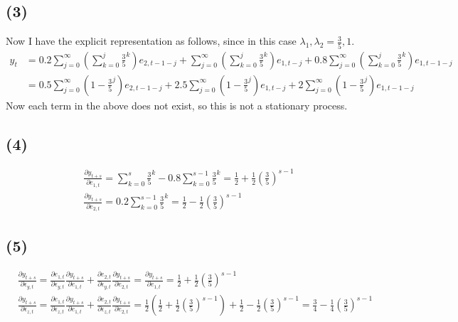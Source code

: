 \documentclass{article}
\begin{document}
\subsection{(3)}
 Now I have the explicit representation as follows, since in this case $\lambda_1, \lambda_2 = \frac{3}{5}, 1$.
\begin{align*}
	y_t &= 0.2 \sum_{j = 0}^{\infty} \left( \sum_{k = 0}^{j} \frac{3}{5}^{k} \right) e_{2, t-1-j}+\sum_{j = 0}^{\infty} \left( \sum_{k = 0}^{j} \frac{3}{5}^{k} \right) e_{1, t-j} + 0.8 \sum_{j = 0}^{\infty} \left( \sum_{k = 0}^{j} \frac{3}{5}^{k} \right) e_{1, t-1-j}\\[10pt]
	&= 0.5 \sum_{j = 0}^{\infty} \left( 1 - \frac{3}{5}^j\right) e_{2, t-1-j} + 2.5 \sum_{j = 0}^{\infty} \left( 1 - \frac{3}{5}^j\right) e_{1, t-j} + 2 \sum_{j = 0}^{\infty} \left( 1 - \frac{3}{5}^j\right) e_{1, t-1-j}
\end{align*}
Now each term in the above does not exist, so this is not a stationary process. 

\subsection{(4)}
\begin{align*}
 &\frac{\partial y_{t+s}}{\partial e_{1, t}} = \sum_{k = 0}^{s} \frac{3}{5}^k - 0.8 \sum_{k = 0}^{s-1} \frac{3}{5}^k = \frac{1}{2} + \frac{1}{2} \left( \frac{3}{5} \right)^{s-1}\\[8pt]
 &\frac{\partial y_{t+s}}{\partial e_{2, t}} = 0.2 \sum_{k = 0}^{s-1} \frac{3}{5}^k = \frac{1}{2} -\frac{1}{2} \left( \frac{3}{5}\right)^{s-1}
\end{align*}

\subsection{(5)}
\begin{align*}
	&\frac{\partial y_{t+s}}{\partial \epsilon_{y, t}} = \frac{\partial e_{1,t}}{\partial \epsilon_{y, t}} \frac{\partial y_{t+s}}{\partial e_{1, t}} + \frac{\partial e_{2,t}}{\partial \epsilon_{y, t}} \frac{\partial y_{t+s}}{\partial e_{2, t}} = \frac{\partial y_{t+s}}{\partial e_{1, t}} = \frac{1}{2} + \frac{1}{2} \left( \frac{3}{5} \right)^{s-1}\\[8pt]
	&\frac{\partial y_{t+s}}{\partial \epsilon_{z, t}} = \frac{\partial e_{1,t}}{\partial \epsilon_{z, t}} \frac{\partial y_{t+s}}{\partial e_{1, t}} + \frac{\partial e_{2,t}}{\partial \epsilon_{z, t}} \frac{\partial y_{t+s}}{\partial e_{2, t}} = \frac{1}{2}\left(  \frac{1}{2} + \frac{1}{2} \left( \frac{3}{5} \right)^{s-1}\right) + \frac{1}{2} -\frac{1}{2} \left( \frac{3}{5}\right)^{s-1} = \frac{3}{4} - \frac{1}{4} \left( \frac{3}{5} \right)^{s-1}
\end{align*}
\end{document}

